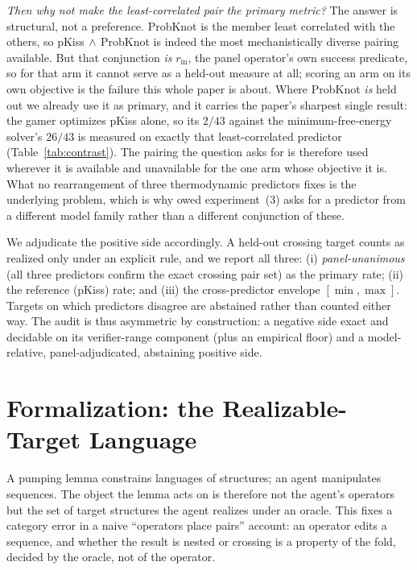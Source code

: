 \documentclass[11pt]{article}
\begin{document}
\emph{Then why not make the least-correlated pair the primary metric?} The answer is structural, not a
preference. ProbKnot is the member least correlated with the others, so pKiss$\,\wedge\,$ProbKnot is indeed
the most mechanistically diverse pairing available. But that conjunction \emph{is} $r_{\mathrm{in}}$, the
panel operator's own success predicate, so for that arm it cannot serve as a held-out measure at all; scoring
an arm on its own objective is the failure this whole paper is about. Where ProbKnot \emph{is} held out we
already use it as primary, and it carries the paper's sharpest single result: the gamer optimizes pKiss alone,
so its $2/43$ against the minimum-free-energy solver's $26/43$ is measured on exactly that least-correlated
predictor (Table~\ref{tab:contrast}). The pairing the question asks for is therefore used wherever it is
available and unavailable for the one arm whose objective it is. What no rearrangement of three thermodynamic
predictors fixes is the underlying problem, which is why owed experiment~(3) asks for a predictor from a
different model family rather than a different conjunction of these.

We adjudicate the positive side accordingly. A held-out crossing target counts as realized only under an
explicit rule, and we report all three: (i) \emph{panel-unanimous} (all three predictors confirm the exact
crossing pair set) as the primary rate; (ii) the reference (pKiss) rate; and (iii) the cross-predictor
envelope $[\min,\max]$. Targets on which predictors disagree are abstained rather than counted either way.
The audit is thus asymmetric by construction: a negative side exact and decidable on its verifier-range component (plus an empirical floor) and a model-relative,
panel-adjudicated, abstaining positive side.


\section{Formalization: the Realizable-Target Language}\label{sec:formal}
A pumping lemma constrains languages of structures; an agent manipulates sequences. The object the lemma acts
on is therefore not the agent's operators but the set of target structures the agent realizes under an
oracle. This fixes a category error in a naive ``operators place pairs'' account: an operator edits a
sequence, and whether the result is nested or crossing is a property of the fold, decided by the oracle, not
of the operator.
\end{document}
